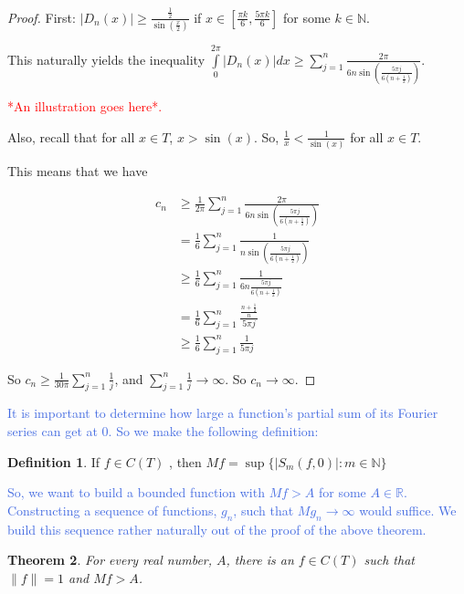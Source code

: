 \documentclass{amsart}
\newcommand{\N}{\mathbb{N}}
\newcommand{\R}{\mathbb{R}}
\newcommand{\colorcomment}[2]{\textcolor{#1}{#2}} %
\newcommand{\absval}[1]{\lvert #1 \rvert}
\newcommand{\norm}[1]{\|#1\|}
\newtheorem{thm}{Theorem}[section]
\theoremstyle{definition}
\newtheorem{definition}[thm]{Definition}
\begin{document}
\begin{proof}

First: $\absval{D_n(x)} \geq \frac{\frac{1}{2}}{\sin(\frac{x}{2})}$ if $x \in [\frac{\pi k}{6},\frac{5 \pi k}{6}]$ for some $k \in \N$.

This naturally yields the inequality $\int\limits_0^{2\pi} \absval{D_n(x)} dx \geq \sum\limits_{j=1}^n \frac{2 \pi}{6n \sin(\frac{5\pi j}{6(n+\frac{1}{2})})}$. 

\colorcomment{red}{*An illustration goes here*.}

Also, recall that for all $x \in T$, $x > \sin(x)$. 
So, $\frac{1}{x} < \frac{1}{\sin(x)}$ for all $x \in T$.

This means that we have

\begin{align*}
c_n &\geq \frac{1}{2 \pi} \sum\limits_{j=1}^n \frac{2 \pi}{6n \sin(\frac{5\pi j}{6(n+\frac{1}{2})})}\\
&= \frac{1}{6} \sum\limits_{j=1}^n \frac{1}{n \sin(\frac{5\pi j}{6(n+\frac{1}{2})})}\\
&\geq \frac{1}{6} \sum\limits_{j=1}^n \frac{1}{6n \frac{5\pi j}{6(n+\frac{1}{2})}}\\
&= \frac{1}{6} \sum\limits_{j=1}^n \frac{\frac{n+\frac{1}{2}}{n}}{5\pi j}\\
&\geq \frac{1}{6} \sum\limits_{j=1}^n \frac{1}{5\pi j}
\end{align*}

So $c_n \geq \frac{1}{30 \pi} \sum\limits_{j=1}^n \frac{1}{ j}$, and $\sum\limits_{j=1}^n \frac{1}{j} \to \infty$. So $c_n \to \infty$.

\end{proof}

\colorcomment{RoyalBlue}{It is important to determine how large a function's partial sum of its Fourier series can get at $0$. 
So we make the following definition:}

\begin{definition}
If $f \in C(T)$ , then $Mf = \sup\{\absval{S_m(f,0)} : m \in \N\}$ 
\end{definition}

\colorcomment{RoyalBlue}{So, we want to build a bounded function with $Mf >A$ for some $A \in \R$.
Constructing a sequence of functions, $g_n$, such that $Mg_n \to \infty$ would suffice.
We build this sequence rather naturally out of the proof of the above theorem.}

\begin{thm}
For every real number, $A$, there is an $f \in C(T)$ such that $\norm{f} = 1$ and $Mf > A$. 
\end{thm}
\end{document}
